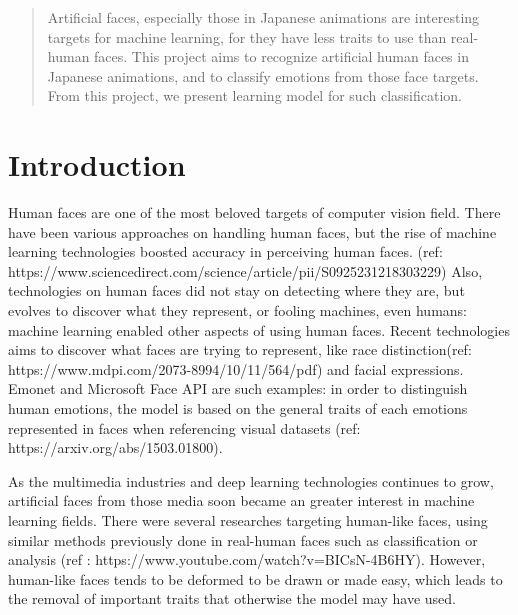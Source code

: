 \documentclass{article}
\begin{document}

\begin{abstract}

Artificial faces, especially those in Japanese animations are interesting targets for machine learning, for they have less traits to use than real-human faces. This project aims to recognize artificial human faces in Japanese animations, and to classify emotions from those face targets. From this project, we present learning model for such classification.

\end{abstract}


\section{Introduction}
\label{introduction}

Human faces are one of the most beloved targets of computer vision field.
There have been various approaches on handling human faces, but the rise of machine learning technologies boosted accuracy in perceiving human faces. (ref: https://www.sciencedirect.com/science/article/pii/S0925231218303229)
Also, technologies on human faces did not stay on detecting where they are, but evolves to discover what they represent, or fooling machines, even humans: machine learning enabled other aspects of using human faces.
Recent technologies aims to discover what faces are trying to represent, like race distinction(ref: https://www.mdpi.com/2073-8994/10/11/564/pdf) and facial expressions.
Emonet and Microsoft Face API are such examples: in order to distinguish human emotions, the model is based on the general traits of each emotions represented in faces when referencing visual datasets (ref: https://arxiv.org/abs/1503.01800).

As the multimedia industries and deep learning technologies continues to grow, artificial faces from those media soon became an greater interest in machine learning fields. There were several researches targeting human-like faces, using similar methods previously done in real-human faces such as classification or analysis (ref : https://www.youtube.com/watch?v=BICsN-4B6HY).
However, human-like faces tends to be deformed to be drawn or made easy, which leads to the removal of important traits that otherwise the model may have used.
\end{document}
